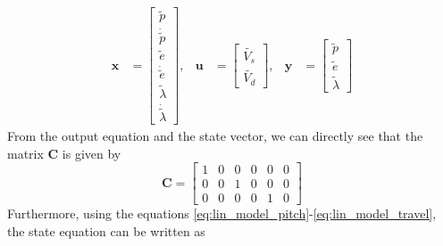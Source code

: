 \begin{align}\label{eq:states_part4}
    \textbf{x} &= \begin{bmatrix} \tilde{p} \\ \dot{\tilde{p}} \\ \tilde{e} \\ \dot{\tilde{e}} \\ \tilde{\lambda} \\ \dot{\tilde{\lambda}} \end{bmatrix}, &\textbf{u} &= \begin{bmatrix} \tilde{V_{s}} \\ \tilde{V_{d}} \end{bmatrix}, &\mathbf{y} &= \begin{bmatrix} \tilde{p} \\ \tilde{e} \\ \tilde{\lambda} \end{bmatrix}
\end{align}
From the output equation and the state vector, we can directly see that the matrix \textbf{C} is given by 
\begin{equation}
    \mathbf{C} = 
    \begin{bmatrix}
    1 & 0 & 0 & 0 & 0 & 0 \\
    0 & 0 & 1 & 0 & 0 & 0 \\
    0 & 0 & 0 & 0 & 1 & 0
    \end{bmatrix}
\end{equation}
Furthermore, using the equations \eqref{eq:lin_model_pitch}-\eqref{eq:lin_model_travel}, the state equation can be written as
